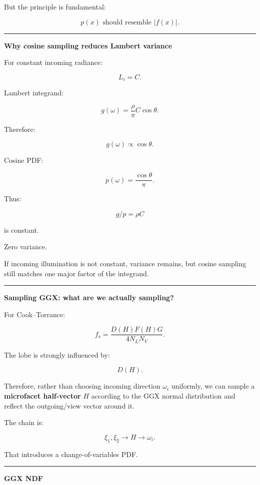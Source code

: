 But the principle is fundamental:

\[
\boxed{
p(x)\text{ should resemble }|f(x)|.
}
\]

\begin{center}\rule{0.5\linewidth}{0.5pt}\end{center}

\textbf{Why cosine sampling reduces Lambert variance}

For constant incoming radiance:

\[
L_i=C.
\]

Lambert integrand:

\[
g(\omega)
=
\frac{\rho}{\pi}
C
\cos\theta.
\]

Therefore:

\[
g(\omega)\propto\cos\theta.
\]

Cosine PDF:

\[
p(\omega)
=
\frac{\cos\theta}{\pi}.
\]

Thus:

\[
g/p
=
\rho C
\]

is constant.

Zero variance.

If incoming illumination is not constant, variance remains, but cosine sampling still matches one major factor of the integrand.

\begin{center}\rule{0.5\linewidth}{0.5pt}\end{center}

\textbf{Sampling GGX: what are we actually sampling?}

For Cook--Torrance:

\[
f_s=
\frac{D(H)F(H)G}{4N_LN_V}.
\]

The lobe is strongly influenced by:

\[
D(H).
\]

Therefore, rather than choosing incoming direction \(\omega_i\) uniformly, we can sample a \textbf{microfacet half-vector} \(H\) according to the GGX normal distribution and reflect the outgoing/view vector around it.

The chain is:

\[
\xi_1,\xi_2
\rightarrow
H
\rightarrow
\omega_i.
\]

That introduces a change-of-variables PDF.

\begin{center}\rule{0.5\linewidth}{0.5pt}\end{center}

\textbf{GGX NDF}


